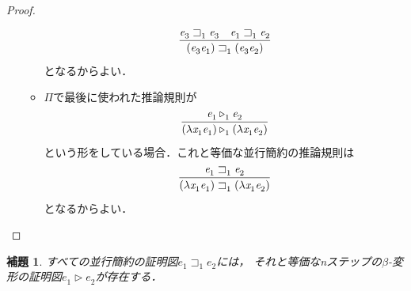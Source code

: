 \documentclass{ltjsbook}%
\newtheorem{lemma}{補題}[section]%
\begin{document}
\begin{proof}
\begin{itemize}
\begin{itemize}
\begin{equation}
      \infer{%
        (\mathit{e}_3^{}\mathit{e}_1^{})\sqsupset_1^{}(\mathit{e}_3^{}\mathit{e}_2^{})%
      }{%
        \mathit{e}_3^{}\sqsupset_1^{}\mathit{e}_3^{}%
      &%
        \mathit{e}_1^{}\sqsupset_1^{}\mathit{e}_2^{}%
      }%
    \end{equation}%
    となるからよい．%
    \item$\Pi$で最後に使われた推論規則が%
    \begin{equation}%
      \infer{%
        (\lambda\mathit{x}_1^{}\mathit{e}_1^{})\triangleright_1^{}%
        (\lambda\mathit{x}_1^{}\mathit{e}_2^{})%
      }{%
        \mathit{e}_1^{}\triangleright_1^{}\mathit{e}_2^{}%
      }%
    \end{equation}%
    という形をしている場合．これと等価な並行簡約の推論規則は%
    \begin{equation}%
      \infer{%
        (\lambda\mathit{x}_1^{}\mathit{e}_1^{})\sqsupset_1^{}%
        (\lambda\mathit{x}_1^{}\mathit{e}_2^{})%
      }{%
        \mathit{e}_1^{}\sqsupset_1^{}\mathit{e}_2^{}%
      }%
    \end{equation}%
    となるからよい．%
    \end{itemize}%
  \end{itemize}%
\end{proof}%
\begin{lemma}%
  \label{lemma:parbeta}%
  すべての並行簡約の証明図$\mathit{e}_1^{}\sqsupset_1^{}\mathit{e}_2^{}$には，%
  それと等価なnステップの$\beta$-変形の証明図$\mathit{e}_1^{}\triangleright\mathit{e}_2^{}$が存在する．%
\end{lemma}%
\end{document}
